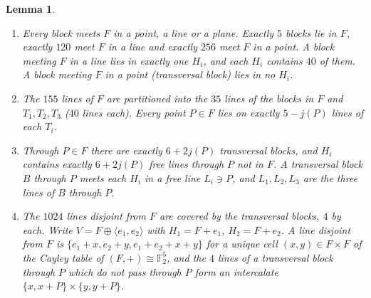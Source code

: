 \documentclass[11pt]{amsart}
\newtheorem{lemma}[theorem]{Lemma}
\theoremstyle{definition}
\newcommand{\F}{\mathbb{F}}
\begin{document}
\begin{lemma}\label{lem:pencil}
\begin{enumerate}[label=(\alph*)]
\item Every block meets $F$ in a point, a line or a plane. Exactly $5$ blocks lie in $F$, exactly $120$ meet $F$ in a line and exactly $256$ meet $F$ in a point. A block meeting $F$ in a line lies in exactly one $H_i$, and each $H_i$ contains $40$ of them. A block meeting $F$ in a point (\emph{transversal block}) lies in no $H_i$.
\item The $155$ lines of $F$ are partitioned into the $35$ lines of the blocks in $F$ and $T_1,T_2,T_3$ ($40$ lines each). Every point $P\in F$ lies on exactly $5-j(P)$ lines of each $T_i$.
\item Through $P\in F$ there are exactly $6+2j(P)$ transversal blocks, and $H_i$ contains exactly $6+2j(P)$ free lines through $P$ not in $F$. A transversal block $B$ through $P$ meets each $H_i$ in a free line $L_i\ni P$, and $L_1,L_2,L_3$ are the three lines of $B$ through $P$.
\item The $1024$ lines disjoint from $F$ are covered by the transversal blocks, $4$ by each. Write $V=F\oplus\langle e_1,e_2\rangle$ with $H_1=F+e_1$, $H_2=F+e_2$. A line disjoint from $F$ is $\{e_1+x,e_2+y,e_1+e_2+x+y\}$ for a unique cell $(x,y)\in F\times F$ of the Cayley table of $(F,+)\cong\F_2^5$, and the $4$ lines of a transversal block through $P$ which do not pass through $P$ form an intercalate $\{x,x+P\}\times\{y,y+P\}$.
\end{enumerate}
\end{lemma}
\end{document}
